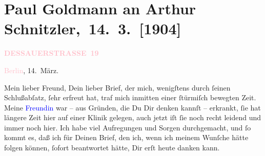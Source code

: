 

\renewcommand{\erwaehntePersonen}{Personen: Theodore Rottenberg, Olga Schnitzler, Heinrich Schnitzler}
\renewcommand{\erwaehnteOrte}{Orte: Berlin, Dessauer Straße, Deutsches Theater Berlin, Italien, Neapel, Palermo, Pompei, Rom, Sizilien, Taormina, Wien}
\renewcommand{\erwaehnteWerke}{Werke: Berliner Theater. »Der einsame Weg«. Von Arthur Schnitzler, Der einsame Weg. Schauspiel in fünf Akten, Neue Freie Presse}
\section[ Paul Goldmann an Arthur Schnitzler, 14. 3. {[}1904{]}]{Paul Goldmann an Arthur Schnitzler, 14. 3. {[}1904{]}}
\nopagebreak{}
\rehead{ }\normalsize\beginnumbering{}
\toendnotes[C]{\smallbreak\pagebreak[2]}
\toendnotes[C]{\smallbreak}
\pstart
           \noindent{}\raggedleft{}{\pb}\textcolor{gray}{\textbf{\textcolor{pink}{DESSAUERSTRASSE 19}{}\ledrightnote{\textcolor{pink}{Dessauer Straße}}}}\pend
           
\pstart
           \textcolor{pink}{Berlin}{}\ledrightnote{\textcolor{pink}{Berlin}}, 14. März.\pend
           
\pstart{}Mein lieber Freund,\pend
\pstart
           Dein lieber Brief, der mich, wenigſtens durch ſeinen Schlußabſatz, ſehr erfreut hat,
               traf mich inmitten einer ſtürmiſch  bewegten Zeit.
               Meine 
               \textcolor{blue}{Freundin}{}\ledrightnote{{$\rightarrow$}\textcolor{blue}{Theodore Rottenberg}}
                war –
               aus Gründen, die Du Dir denken kannſt – erkrankt, 
               ſie hat längere Zeit hier auf einer Klinik
               gelegen, auch jetzt iſt ſie noch recht leidend und immer noch hier. Ich habe viel
               Aufregungen und Sorgen durchgemacht, und ſo kommt es, daß ich \introOben{}für\introOben{} Deinen Brief, den ich, wenn ich meinem Wunſche hätte \strikeout{\textcolor{gray}{erf}} folgen können, ſofort beantwortet hätte, Dir erſt heute danken kann.\pend
           
